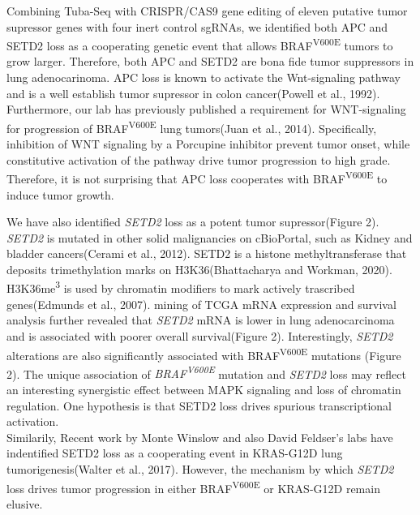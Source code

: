 Combining Tuba-Seq with CRISPR/CAS9 gene editing of eleven putative tumor supressor genes with four inert control sgRNAs, we identified both APC and SETD2 loss as a cooperating genetic event that allows BRAF\textsuperscript{V600E} tumors to grow larger.
Therefore, both APC and SETD2 are bona fide tumor suppressors in lung adenocarinoma.
APC loss is known to activate the Wnt-signaling pathway and is a well establish tumor supressor in colon cancer(Powell et al., 1992).
Furthermore, our lab has previously published a requirement for WNT-signaling for progression of BRAF\textsuperscript{V600E} lung tumors(Juan et al., 2014).
Specifically, inhibition of WNT signaling by a Porcupine inhibitor prevent tumor onset, while constitutive activation of the pathway drive tumor progression to high grade.
Therefore, it is not surprising that APC loss cooperates with BRAF\textsuperscript{V600E} to induce tumor growth.

We have also identified \emph{SETD2} loss as a potent tumor supressor(Figure 2).
\emph{SETD2} is mutated in other solid malignancies on cBioPortal, such as Kidney and bladder cancers(Cerami et al., 2012).
SETD2 is a histone methyltransferase that deposits trimethylation marks on H3K36(Bhattacharya and Workman, 2020).
H3K36me\textsuperscript{3} is used by chromatin modifiers to mark actively trascribed genes(Edmunds et al., 2007).
mining of TCGA mRNA expression and survival analysis further revealed that \emph{SETD2} mRNA is lower in lung adenocarcinoma and is associated with poorer overall survival(Figure 2).
Interestingly, \emph{SETD2} alterations are also significantly associated with BRAF\textsuperscript{V600E} mutations (Figure 2).
The unique association of \emph{BRAF\textsuperscript{V600E}} mutation and \emph{SETD2} loss may reflect an interesting synergistic effect between MAPK signaling and loss of chromatin regulation.
One hypothesis is that SETD2 loss drives spurious transcriptional activation.\\
Similarily, Recent work by Monte Winslow and also David Feldser's labs have indentified SETD2 loss as a cooperating event in KRAS-G12D lung tumorigenesis(Walter et al., 2017).
However, the mechanism by which \emph{SETD2} loss drives tumor progression in either BRAF\textsuperscript{V600E} or KRAS-G12D remain elusive.

